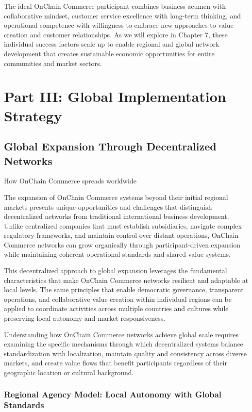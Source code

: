 \documentclass[
  Letterpaper,
]{scrbook}
\begin{document}
The ideal OnChain Commerce participant combines business acumen with
collaborative mindset, customer service excellence with long-term
thinking, and operational competence with willingness to embrace new
approaches to value creation and customer relationships. As we will
explore in Chapter 7, these individual success factors scale up to
enable regional and global network development that creates sustainable
economic opportunities for entire communities and market sectors.

\part{Part III: Global Implementation Strategy}

\chapter{Global Expansion Through Decentralized
Networks}\label{sec-global-expansion}

How OnChain Commerce spreads worldwide

The expansion of OnChain Commerce systems beyond their initial regional
markets presents unique opportunities and challenges that distinguish
decentralized networks from traditional international business
development. Unlike centralized companies that must establish
subsidiaries, navigate complex regulatory frameworks, and maintain
control over distant operations, OnChain Commerce networks can grow
organically through participant-driven expansion while maintaining
coherent operational standards and shared value systems.

This decentralized approach to global expansion leverages the
fundamental characteristics that make OnChain Commerce networks
resilient and adaptable at local levels. The same principles that enable
democratic governance, transparent operations, and collaborative value
creation within individual regions can be applied to coordinate
activities across multiple countries and cultures while preserving local
autonomy and market responsiveness.

Understanding how OnChain Commerce networks achieve global scale
requires examining the specific mechanisms through which decentralized
systems balance standardization with localization, maintain quality and
consistency across diverse markets, and create value flows that benefit
participants regardless of their geographic location or cultural
background.

\section{Regional Agency Model: Local Autonomy with Global
Standards}\label{regional-agency-model-local-autonomy-with-global-standards}
\end{document}
